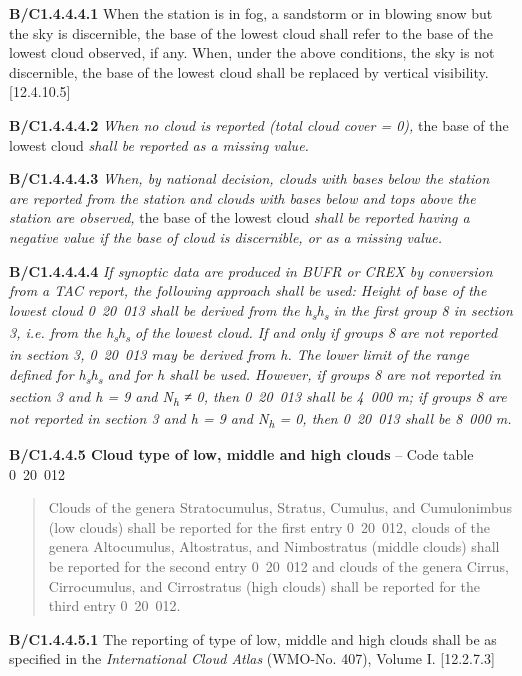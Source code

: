 \textbf{B/C1.4.4.4.1} When the station is in fog, a sandstorm or in blowing snow but the sky is discernible, the base of the lowest cloud shall refer to the base of the lowest cloud observed, if any. When, under the above conditions, the sky is not discernible, the base of the lowest cloud shall be replaced by vertical visibility. {[}12.4.10.5{]}

\textbf{B/C1.4.4.4.2} \emph{When no cloud is reported (total cloud cover = 0),} the base of the lowest cloud \emph{shall be reported as a missing value.}

\textbf{B/C1.4.4.4.3} \emph{When, by national decision, clouds with bases below the station are reported from the station and clouds with bases below and tops above the station are observed,} the base of the lowest cloud \emph{shall be reported having a negative value if the base of cloud is discernible, or as a missing value.}

\textbf{B/C1.4.4.4.4} \emph{If synoptic data are produced in BUFR or CREX by conversion from a TAC report, the following approach shall be used: Height of base of the lowest cloud 0}~\emph{20}~\emph{013 shall be derived from the h\textsubscript{s}h\textsubscript{s} in the first group 8 in section 3, i.e. from the h\textsubscript{s}h\textsubscript{s} of the lowest cloud. If and only if groups 8 are not reported in section 3, 0}~\emph{20}~\emph{013 may be derived from h. The lower limit of the range defined for h\textsubscript{s}h\textsubscript{s} and for h shall be used. However, if groups 8 are not reported in section 3 and h = 9 and N\textsubscript{h} ≠ 0, then 0}~\emph{20}~\emph{013 shall be 4}~\emph{000 m; if groups 8 are not reported in section 3 and h = 9 and N\textsubscript{h} = 0, then 0}~\emph{20}~\emph{013 shall be 8}~\emph{000 m.}

\textbf{B/C1.4.4.5 Cloud type of low, middle and high clouds} -- Code table 0~20~012

\begin{quote}
Clouds of the genera Stratocumulus, Stratus, Cumulus, and Cumulonimbus (low clouds) shall be reported for the first entry 0~20~012, clouds of the genera Altocumulus, Altostratus, and Nimbostratus (middle clouds) shall be reported for the second entry 0~20~012 and clouds of the genera Cirrus, Cirrocumulus, and Cirrostratus (high clouds) shall be reported for the third entry 0~20~012.
\end{quote}

\textbf{B/C1.4.4.5.1} The reporting of type of low, middle and high clouds shall be as specified in the \emph{International Cloud Atlas} (WMO-No. 407), Volume I. {[}12.2.7.3{]}

